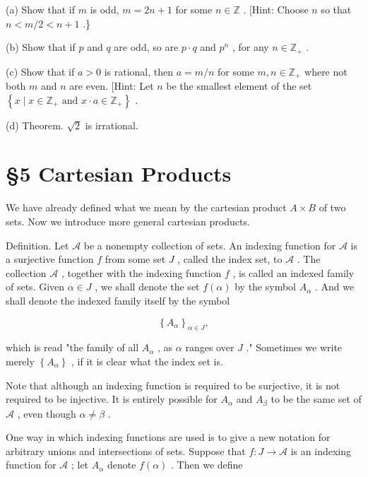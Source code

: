 (a) Show that if \(m\) is odd, \(m = {2n} + 1\) for some \(n \in  \mathbb{Z}\) . [Hint: Choose \(n\) so that \(n < m/2 < n + 1\) .\}

(b) Show that if \(p\) and \(q\) are odd, so are \(p \cdot  q\) and \({p}^{n}\) , for any \(n \in  {\mathbb{Z}}_{ + }\) .

(c) Show that if \(a > 0\) is rational, then \(a = m/n\) for some \(m,n \in  {\mathbb{Z}}_{ + }\) where not both \(m\) and \(n\) are even. [Hint: Let \(n\) be the smallest element of the set \(\left\{  {x \mid  x \in  {\mathbb{Z}}_{ + }\text{ and }x \cdot  a \in  {\mathbb{Z}}_{ + }}\right\}\) .

(d) Theorem. \(\sqrt{2}\) is irrational.

\section*{§5 Cartesian Products}

We have already defined what we mean by the cartesian product \(A \times  B\) of two sets. Now we introduce more general cartesian products.

Definition. Let \(\mathcal{A}\) be a nonempty collection of sets. An indexing function for \(\mathcal{A}\) is a surjective function \(f\) from some set \(J\) , called the index set, to \(\mathcal{A}\) . The collection \(\mathcal{A}\) , together with the indexing function \(f\) , is called an indexed family of sets. Given \(\alpha  \in  J\) , we shall denote the set \(f\left( \alpha \right)\) by the symbol \({A}_{\alpha }\) . And we shall denote the indexed family itself by the symbol

\[
{\left\{  {A}_{\alpha }\right\}  }_{\alpha  \in  J},
\]

which is read "the family of all \({A}_{\alpha }\) , as \(\alpha\) ranges over \(J\) ." Sometimes we write merely \(\left\{  {A}_{\alpha }\right\}\) , if it is clear what the index set is.

Note that although an indexing function is required to be surjective, it is not required to be injective. It is entirely possible for \({A}_{\alpha }\) and \({A}_{\beta }\) to be the same set of \(\mathcal{A}\) , even though \(\alpha  \neq  \beta\) .

One way in which indexing functions are used is to give a new notation for arbitrary unions and intersections of sets. Suppose that \(f : J \rightarrow  \mathcal{A}\) is an indexing function for \(\mathcal{A}\) ; let \({A}_{\alpha }\) denote \(f\left( \alpha \right)\) . Then we define

